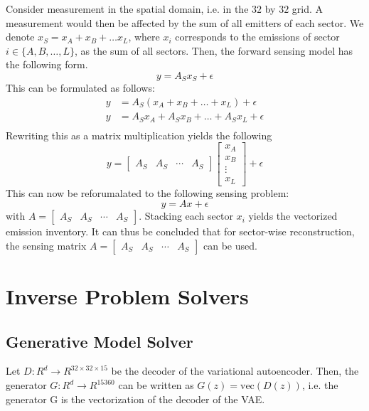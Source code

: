 Consider measurement in the spatial domain, i.e. in the $32$ by $32$ grid.
A measurement would then be affected by the sum of all emitters of each sector.
We denote $x_S = x_A + x_B + \dots x_L$, where $x_i$ corresponds to the emissions of sector $i \in \{A, B, \dots, L\}$, as the sum of all sectors.
Then, the forward sensing model has the following form.
\begin{equation}
    y = A_S x_S + \epsilon
\end{equation}
This can be formulated as follows:
\begin{align}
    y &= A_S (x_A + x_B + \dots + x_L) + \epsilon \\
    y &= A_S x_A + A_S x_B + \dots + A_S x_L + \epsilon \\
\end{align}
Rewriting this as a matrix multiplication yields the following
\begin{equation}
    y = \begin{bmatrix} A_S & A_S & \cdots & A_S \end{bmatrix}\begin{bmatrix} x_A \\ x_B \\ \vdots \\x_L \end{bmatrix} + \epsilon
\end{equation}
This can now be reforumalated to the following sensing problem:
\begin{equation}
    y = Ax + \epsilon
\end{equation}
with $A = \begin{bmatrix} A_S & A_S & \cdots & A_S \end{bmatrix}$.
Stacking each sector $x_i$ yields the vectorized emission inventory.
It can thus be concluded that for sector-wise reconstruction, the sensing matrix $A = \begin{bmatrix} A_S & A_S & \cdots & A_S \end{bmatrix}$ can be used.

\section{Inverse Problem Solvers}

\subsection{Generative Model Solver}
Let $D: R^d \rightarrow R^{32 \times 32 \times 15}$ be the decoder of the variational autoencoder.
Then, the generator $G: R^d \rightarrow R^{15360}$ can be written as $G(z) = \text{vec}(D(z))$, i.e. the generator G is the vectorization of the decoder of the VAE.

